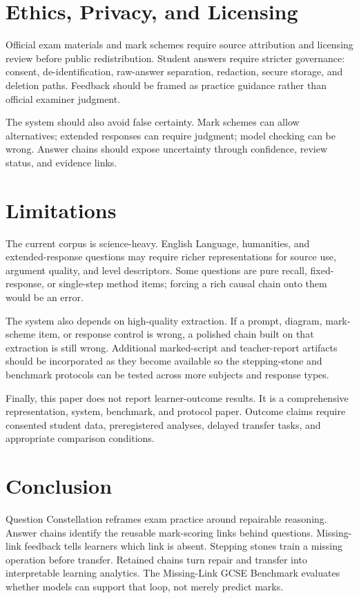 \documentclass[11pt]{article}
\begin{document}
\section{Ethics, Privacy, and Licensing}

Official exam materials and mark schemes require source attribution and licensing review before public redistribution. Student answers require stricter governance: consent, de-identification, raw-answer separation, redaction, secure storage, and deletion paths. Feedback should be framed as practice guidance rather than official examiner judgment.

The system should also avoid false certainty. Mark schemes can allow alternatives; extended responses can require judgment; model checking can be wrong. Answer chains should expose uncertainty through confidence, review status, and evidence links.

\section{Limitations}

The current corpus is science-heavy. English Language, humanities, and extended-response questions may require richer representations for source use, argument quality, and level descriptors. Some questions are pure recall, fixed-response, or single-step method items; forcing a rich causal chain onto them would be an error.

The system also depends on high-quality extraction. If a prompt, diagram, mark-scheme item, or response control is wrong, a polished chain built on that extraction is still wrong. Additional marked-script and teacher-report artifacts should be incorporated as they become available so the stepping-stone and benchmark protocols can be tested across more subjects and response types.

Finally, this paper does not report learner-outcome results. It is a comprehensive representation, system, benchmark, and protocol paper. Outcome claims require consented student data, preregistered analyses, delayed transfer tasks, and appropriate comparison conditions.

\section{Conclusion}

Question Constellation reframes exam practice around repairable reasoning. Answer chains identify the reusable mark-scoring links behind questions. Missing-link feedback tells learners which link is absent. Stepping stones train a missing operation before transfer. Retained chains turn repair and transfer into interpretable learning analytics. The Missing-Link GCSE Benchmark evaluates whether models can support that loop, not merely predict marks.
\end{document}
